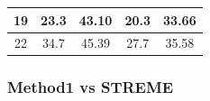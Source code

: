 \documentclass{article}
\begin{document}
\begin{Large}
\begin{table}[h]
\begin{tabular}{|c|cc|cc|}
19                                                                       & \multicolumn{1}{c|}{23.3}                                                    & 43.10                                                       & \multicolumn{1}{c|}{20.3}                                                    & 33.66                                                       \\ \hline
22                                                                       & \multicolumn{1}{c|}{34.7}                                                    & 45.39                                                       & \multicolumn{1}{c|}{27.7}                                                    & 35.58                                                       \\ \hline
\end{tabular}
\end{table}


\newpage
\subsubsection{Method1 vs STREME}


\end{Large}
\end{document}
